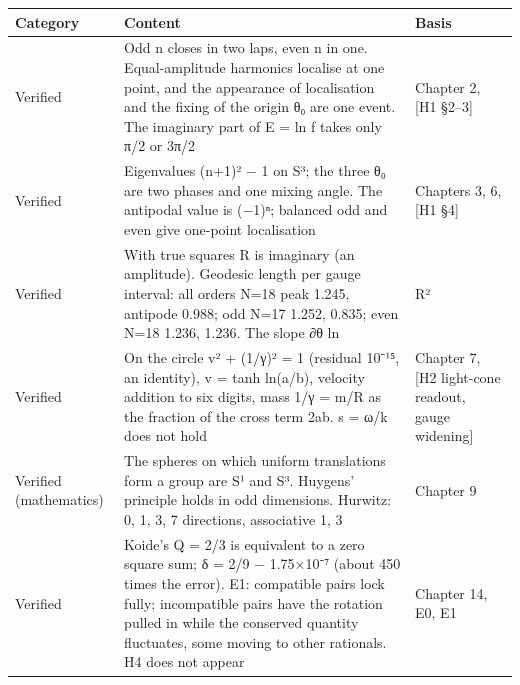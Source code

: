 \documentclass[
  a4paper,
]{article}
\newcounter{none} %
\begin{document}
{\def\LTcaptype{none} %
\begin{longtable}[]{@{}
  >{\raggedright\arraybackslash}p{}
  >{\raggedright\arraybackslash}p{}
  >{\raggedright\arraybackslash}p{}@{}}
\toprule\noalign{}
\begin{minipage}[b]{\linewidth}\raggedright
Category
\end{minipage} & \begin{minipage}[b]{\linewidth}\raggedright
Content
\end{minipage} & \begin{minipage}[b]{\linewidth}\raggedright
Basis
\end{minipage} \\
\midrule\noalign{}
\endhead
\bottomrule\noalign{}
\endlastfoot
Verified & Odd n closes in two laps, even n in one. Equal-amplitude
harmonics localise at one point, and the appearance of localisation and
the fixing of the origin θ₀ are one event. The imaginary part of E = ln
f takes only π/2 or 3π/2 & Chapter 2, {[}H1 §2--3{]} \\
Verified & Eigenvalues (n+1)² − 1 on S³; the three θ₀ are two phases and
one mixing angle. The antipodal value is (−1)ⁿ; balanced odd and even
give one-point localisation & Chapters 3, 6, {[}H1 §4{]} \\
Verified & With true squares R is imaginary (an amplitude). Geodesic
length per gauge interval: all orders N=18 peak 1.245, antipode 0.988;
odd N=17 1.252, 0.835; even N=18 1.236, 1.236. The slope ∂θ ln & R² \\
Verified & On the circle v² + (1/γ)² = 1 (residual 10⁻¹⁵, an identity),
v = tanh ln(a/b), velocity addition to six digits, mass 1/γ = m/R as the
fraction of the cross term 2ab. s = ω/k does not hold & Chapter 7, {[}H2
light-cone readout, gauge widening{]} \\
Verified (mathematics) & The spheres on which uniform translations form
a group are S¹ and S³. Huygens' principle holds in odd dimensions.
Hurwitz: 0, 1, 3, 7 directions, associative 1, 3 & Chapter 9 \\
Verified & Koide's Q = 2/3 is equivalent to a zero square sum; δ = 2/9 −
1.75×10⁻⁷ (about 450 times the error). E1: compatible pairs lock fully;
incompatible pairs have the rotation pulled in while the conserved
quantity fluctuates, some moving to other rationals. H4 does not appear
& Chapter 14, E0, E1 \\

\end{longtable}}
\end{document}
